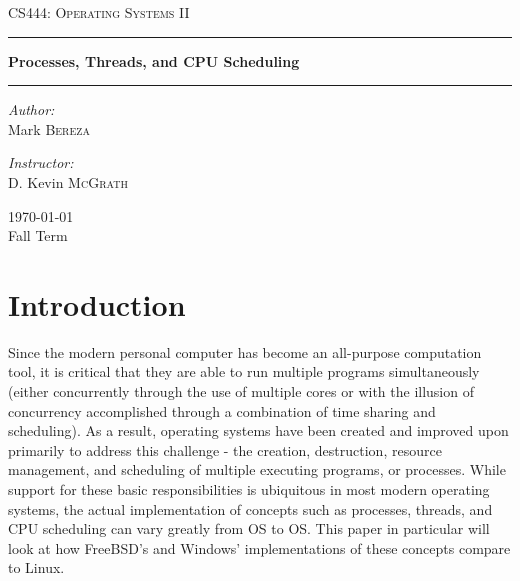 \documentclass[onecolumn, draftclsnofoot,10pt, compsoc]{IEEEtran}
\begin{document}
\begin{titlepage}
\begin{center}

\vspace*{50mm}

\textsc{\LARGE CS444: Operating Systems II}\\[1.5cm]

\hrule
\vspace{5mm}
{ \huge \bfseries Processes, Threads, and CPU Scheduling \\[0.9cm] }
\hrule 
\vspace{5mm}

\noindent
\begin{minipage}{0.4\textwidth}

\begin{flushleft} \large
\emph{Author:}\\
Mark \textsc{Bereza}
\end{flushleft}
\end{minipage}%
\begin{minipage}{0.4\textwidth}
\begin{flushright} \large
\emph{Instructor:} \\
D. Kevin \textsc{McGrath}
\end{flushright}

\end{minipage}

\vspace*{\fill}
{\large \today}\\
{\large Fall Term}

\end{center}
\end{titlepage}
  
\tableofcontents
\newpage

\section{Introduction}
Since the modern personal computer has become an all-purpose computation tool, it is critical that they are able to run multiple programs simultaneously (either concurrently through the use of multiple cores or with the illusion of concurrency accomplished through a combination of time sharing and scheduling). As a result, operating systems have been created and improved upon primarily to address this challenge - the creation, destruction, resource management, and scheduling of multiple executing programs, or processes. While support for these basic responsibilities is ubiquitous in most modern operating systems, the actual implementation of concepts such as processes, threads, and CPU scheduling can vary greatly from OS to OS. This paper in particular will look at how FreeBSD's and Windows' implementations of these concepts compare to Linux.
\end{document}
